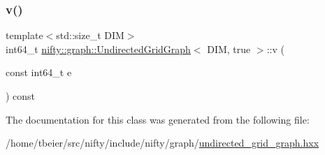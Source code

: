 \mbox{\label{classnifty_1_1graph_1_1UndirectedGridGraph_3_01DIM_00_01true_01_4_a931c1a92fb28eab2e47e7abb5a2cd941}} 
\subsubsection{\texorpdfstring{v()}{v()}}
{\footnotesize\ttfamily template$<$std\+::size\+\_\+t D\+IM$>$ \\
int64\+\_\+t \hyperlink{classnifty_1_1graph_1_1UndirectedGridGraph}{nifty\+::graph\+::\+Undirected\+Grid\+Graph}$<$ D\+IM, true $>$\+::v (\begin{DoxyParamCaption}\item[{const int64\+\_\+t}]{e }\end{DoxyParamCaption}) const\hspace{0.3cm}{\ttfamily [inline]}}



The documentation for this class was generated from the following file\+:\begin{DoxyCompactItemize}
\item 
/home/tbeier/src/nifty/include/nifty/graph/\hyperlink{graph_2undirected__grid__graph_8hxx}{undirected\+\_\+grid\+\_\+graph.\+hxx}\end{DoxyCompactItemize}
